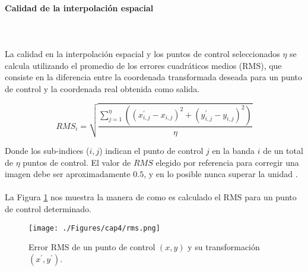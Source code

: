   \paragraph{Calidad de la interpolaci\'on espacial }\mbox{}\\\mbox{}\\
 La calidad en la interpolaci\'on espacial y los puntos de control seleccionados $ \eta $ se calcula utilizando el promedio de los errores cuadráticos medios (RMS), que consiste en la diferencia entre la coordenada transformada deseada para un punto de control y la coordenada real obtenida como salida.

 \begin{equation}
 RMS_{i} = \sqrt{\dfrac{\sum_{j=1}^{\eta} ((x_{i,j}^{'}-x_{i,j})^{2}+(y_{i,j}^{'}-y_{i,j})^{2})}{\eta}}
 \end{equation} 

 	Donde los sub-indices ($i,j$) indican el punto de control $ j $ en la banda $ i $ de un total de $ \eta $ puntos de control. El valor de $ RMS $ elegido por referencia para corregir una imagen debe ser aproximadamente $ 0.5 $, y en lo posible nunca superar la unidad \cite{guide1999erdas}. \\~\\
 	La Figura \ref{fig:rms} nos muestra la manera de como es calculado el RMS para un punto de control determinado.
 
 
     \begin{figure}[H]
     	\centering
     	\texttt{[image: ./Figures/cap4/rms.png]}
     	\caption{Error RMS de un punto de control $ (x,y) $ y su transformaci\'on $ (x^{'},y^{'}) $.}
     	\label{fig:rms}
     \end{figure}




